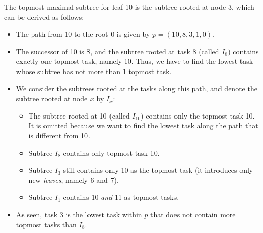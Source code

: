 \begin{center}
\end{center}

The topmost-maximal subtree for leaf 10 is the subtree rooted at node 3, which can be derived as follows:
\begin{itemize}
\item The path from 10 to the root 0 is given by $p=(10,8,3,1,0)$.
\item The successor of 10 is 8, and the subtree rooted at task 8 (called $I_8$) contains exactly one topmost task, namely 10. Thus, we have to find the lowest task whose subtree has not more than 1 topmost task.
\item We consider the subtrees rooted at the tasks along this path, and denote the subtree rooted at node $x$ by $I_x$:
  \begin{itemize}
  \item The subtree rooted at 10 (called $I_{10}$) contains only the topmost task 10. It is omitted because we want to find the lowest task along the path that is different from 10.
  \item Subtree $I_8$ contains only topmost task 10.
  \item Subtree $I_3$ still contains only 10 as the topmost task (it introduces only new \emph{leaves}, namely 6 and 7).
  \item Subtree $I_1$ contains 10 \emph{and} 11 as topmost tasks.
  \end{itemize}
\item As seen, task 3 is the lowest task within $p$ that does not contain more topmost tasks than $I_8$.
\end{itemize}

